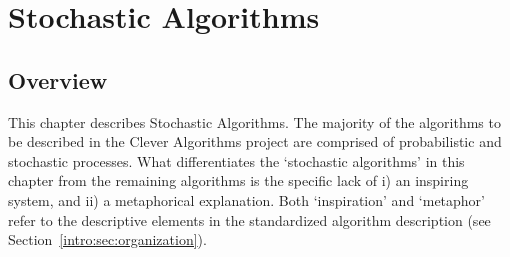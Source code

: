

\chapter{Stochastic Algorithms}
\label{ch:stochastic}


% 
% 
\section{Overview}
This chapter describes Stochastic Algorithms.
The majority of the algorithms to be described in the Clever Algorithms project are comprised of probabilistic and stochastic processes. What differentiates the `stochastic algorithms' in this chapter from the remaining algorithms is the specific lack of i) an inspiring system, and ii) a metaphorical explanation. Both `inspiration' and `metaphor' refer to the descriptive elements in the standardized algorithm description (see Section~\ref{intro:sec:organization}).


